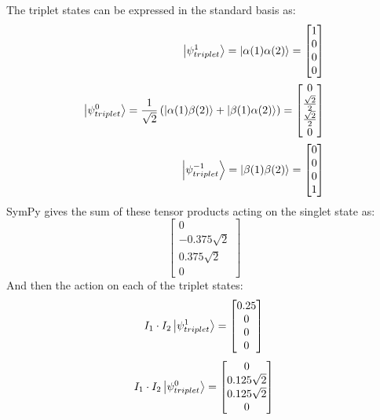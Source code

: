 \documentclass[12pt]{article}
\begin{document}
The triplet states can be expressed in the standard basis as:
\begin{align}
  \ket{\psi_{triplet}^{1}} = \ket{\alpha(1)\alpha(2)} = \left[\begin{matrix}1\\0\\0\\0\end{matrix}\right]\\
  \ket{\psi_{triplet}^{0}} = \frac{1}{\sqrt{2}} \left( \ket{\alpha(1)\beta(2)} + \ket{\beta(1)\alpha(2)} \right) = \left[\begin{matrix}0\\\frac{\sqrt{2}}{2}\\\frac{\sqrt{2}}{2}\\0\end{matrix}\right]\\
  \ket{\psi_{triplet}^{-1}} = \ket{\beta(1)\beta(2)} = \left[\begin{matrix}0\\0\\0\\1\end{matrix}\right]
\end{align}
SymPy gives the sum of these tensor products acting on the singlet state as:
\begin{equation}
  \left[\begin{matrix}0\\- 0.375 \sqrt{2}\\0.375 \sqrt{2}\\0\end{matrix}\right]
\end{equation}
And then the action on each of the triplet states:
\begin{equation}
  I_1 \cdot I_2 \ket{\psi_{triplet}^{1}} = \left[\begin{matrix}0.25\\0\\0\\0\end{matrix}\right]
\end{equation}
\begin{equation}
  I_1 \cdot I_2 \ket{\psi_{triplet}^{0}} = \left[\begin{matrix}0\\0.125 \sqrt{2}\\0.125 \sqrt{2}\\0\end{matrix}\right]
\end{equation}
\end{document}
